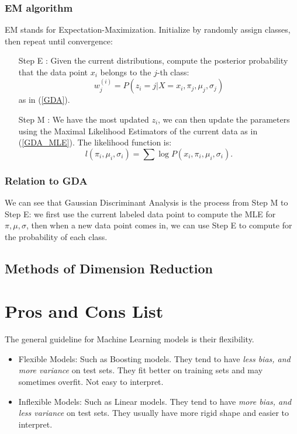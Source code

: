 \documentclass[12pt]{amsart}
\numberwithin{equation}{section}
\theoremstyle{plain}
\theoremstyle{definition}
\begin{document}
\subsubsection{EM algorithm}
EM stands for Expectation-Maximization. Initialize by randomly assign classes, then repeat until convergence:
\begin{itemize}
\item[Step E]: Given the current distributions, compute the posterior probability that the data point $x_i$ belongs to the $j$-th class:
$$
w_j^{(i)} = P(z_i = j| X = x_i, \pi_j, \mu_j, \sigma_j)
$$
as in (\ref{GDA}).

\item[Step M]: We have the most updated $z_i$, we can then update the parameters using the Maximal Likelihood Estimators of the current data as in (\ref{GDA_MLE}). The likelihood function is:
$$
l(\pi_i,\mu_i,\sigma_i) = \sum\log P(x_i, \pi_i,\mu_i,\sigma_i).
$$
\end{itemize}

\subsubsection{Relation to GDA}
We can see that Gaussian Discriminant Analysis is the process from Step M to Step E: we first use the current labeled data point to compute the MLE for $\pi, \mu, \sigma$, then when a new data point comes in, we can use Step E to compute for the probability of each class.

\subsection{Methods of Dimension Reduction}

\section{Pros and Cons List}
The general guideline for Machine Learning models is their flexibility.
\begin{itemize}
\item Flexible Models: Such as Boosting models. They tend to have {\em less bias, and more variance} on test sets. They fit better on training sets and may sometimes overfit. Not easy to interpret.
\item Inflexible Models: Such as Linear models. They tend to have {\em more bias, and less variance} on test sets. They usually have more rigid shape and easier to interpret. 
\end{itemize}
\end{document}
